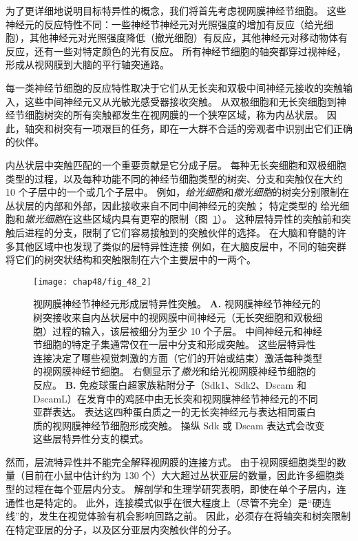 为了更详细地说明目标特异性的概念，我们将首先考虑视网膜神经节细胞。
这些神经元的反应特性不同：一些神经节神经元对光照强度的增加有反应（给光细胞），其他神经元对光照强度降低（撤光细胞）有反应，其他神经元对移动物体有反应，还有一些对特定颜色的光有反应。
所有神经节细胞的轴突都穿过视神经，形成从视网膜到大脑的平行轴突通路。


每一类神经节细胞的反应特性取决于它们从无长突和双极中间神经元接收的突触输入，这些中间神经元又从光敏光感受器接收突触。
从双极细胞和无长突细胞到神经节细胞树突的所有突触都发生在视网膜的一个狭窄区域，称为内丛状层。
因此，轴突和树突有一项艰巨的任务，即在一大群不合适的旁观者中识别出它们正确的伙伴。


内丛状层中突触匹配的一个重要贡献是它分成子层。
每种无长突细胞和双极细胞类型的过程，以及每种功能不同的神经节细胞类型的树突、分支和突触仅在大约 10 个子层中的一个或几个子层中。
例如，\textit{给光细胞}和\textit{撤光细胞}的树突分别限制在丛状层的内部和外部，因此接收来自不同中间神经元的突触；
特定类型的 给光细胞和\textit{撤光细胞}在这些区域内具有更窄的限制（图~\ref{fig:48_2}）。
这种层特异性的突触前和突触后进程的分支，限制了它们容易接触到的突触伙伴的选择。
在大脑和脊髓的许多其他区域中也发现了类似的层特异性连接
例如，在大脑皮层中，不同的轴突群将它们的树突状结构和突触限制在六个主要层中的一两个。


\begin{figure}[htbp]
	\centering
	\texttt{[image: chap48/fig\_48\_2]}
	\caption{视网膜神经节神经元形成层特异性突触。
		\textbf{A.} 视网膜神经节神经元的树突接收来自内丛状层中的视网膜中间神经元（无长突细胞和双极细胞）过程的输入，该层被细分为至少 10 个子层。
		中间神经元和神经节细胞的特定子集通常仅在一层中分支和形成突触。
		这些层特异性连接决定了哪些视觉刺激的方面（它们的开始或结束）激活每种类型的视网膜神经节细胞。
		右侧显示了\textit{撤光}和给光视网膜神经节细胞的反应。
		\textbf{B.} 免疫球蛋白超家族粘附分子（Sdk1、Sdk2、Dscam 和 DscamL）在发育中的鸡胚中由无长突和视网膜神经节神经元的不同亚群表达。
		表达这四种蛋白质之一的无长突神经元与表达相同蛋白质的视网膜神经节细胞形成突触。
		操纵 Sdk 或 Dscam 表达式会改变这些层特异性分支的模式。}
	\label{fig:48_2}
\end{figure}


然而，层流特异性并不能完全解释视网膜的连接方式。
由于视网膜细胞类型的数量（目前在小鼠中估计约为 130 个）大大超过丛状亚层的数量，因此许多细胞类型的过程在每个亚层内分支。
解剖学和生理学研究表明，即使在单个子层内，连通性也是特定的。
此外，连接模式似乎在很大程度上（尽管不完全）是“硬连线”的，发生在视觉体验有机会影响回路之前。
因此，必须存在将轴突和树突限制在特定亚层的分子，以及区分亚层内突触伙伴的分子。


